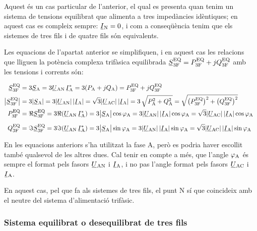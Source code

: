 Aquest és un cas particular de l'anterior, el qual es presenta quan
tenim un sistema de tensions equilibrat que alimenta a tres
impedàncies idèntiques; en aquest cas es compleix sempre:
$\cmplx{I}\ped{N}=0$, i com a conseqüència tenim que els sistemes de tres
fils i de quatre fils són equivalents.

Les equacions de l'apartat anterior se simplifiquen, i en aquest
cas les relacions que lliguen la  potència complexa trifàsica
equilibrada $\cmplx{S}\ped{3F}\ap{EQ} = P\ped{3F}\ap{EQ} + j
Q\ped{3F}\ap{EQ}$ amb les tensions i corrents són:

\begin{align}
    \cmplx{S}\ped{3F}\ap{EQ} &= 3\cmplx{S}\ped{A} = 3\cmplx{U}\ped{AN}\, \cmplx{I}\ped{A}^* =
    3 (P\ped{A} + j Q\ped{A}) = P\ped{3F}\ap{EQ} +j Q\ped{3F}\ap{EQ} \label{eq:s_3f_eq}\\
    \big|\cmplx{S}\ped{3F}\ap{EQ}\big| &= 3|\cmplx{S}\ped{A} | =   3 |\cmplx{U}\ped{AN}| \,|\cmplx{I}\ped{A}| =
    \sqrt{3} |\cmplx{U}\ped{AC}|\, |\cmplx{I}\ped{A}| = 3\,\sqrt{P\ped{A}^2 + Q\ped{A}^2} =
    \sqrt{\big(P\ped{3F}\ap{EQ}\big)^2 + \big(Q\ped{3F}\ap{EQ}\big)^2} \\
    P\ped{3F}\ap{EQ} &= \Re\cmplx{S}\ped{3F}\ap{EQ} =3\Re(\cmplx{U}\ped{AN} \,\cmplx{I}\ped{A}^*) =
    3\big|\cmplx{S}\ped{A}\big| \cos \varphi\ped{A} = 3 |\cmplx{U}\ped{AN}|\,
    |\cmplx{I}\ped{A}|\label{eq:p_3f_34}
    \cos \varphi\ped{A} = \sqrt{3} |\cmplx{U}\ped{AC}|\,|\cmplx{I}\ped{A}| \cos \varphi\ped{A} \\[2mm]
    Q\ped{3F}\ap{EQ} &= \Im\cmplx{S}\ped{3F}\ap{EQ}= 3\Im(\cmplx{U}\ped{AN}\, \cmplx{I}\ped{A}^*) =
    3\big|\cmplx{S}\ped{A}\big|  \sin \varphi\ped{A} = 3 |\cmplx{U}\ped{AN}| \, |\cmplx{I}\ped{A}|\label{eq:q_3f_34}
    \sin\varphi\ped{A}=\sqrt{3} |\cmplx{U}\ped{AC}|\,|\cmplx{I}\ped{A}|\sin \varphi\ped{A}
\end{align}

En les equacions anteriors s'ha utilitzat la fase A, però es
podria haver escollit també qualsevol de les altres dues. Cal tenir
en compte a més, que l'angle $\varphi_\mathrm{A}$ és sempre el format
pels fasors $\cmplx{U}\ped{AN}$ i $\cmplx{I}\ped{A}$, i no pas
l'angle format pels fasors $\cmplx{U}\ped{AC}$ i
$\cmplx{I}\ped{A}$.

En aquest cas, pel que fa als sistemes de tres fils,  el punt N sí
que coincideix amb el neutre del sistema d'alimentació trifàsic.

\subsubsection{Sistema equilibrat o desequilibrat de tres fils}

